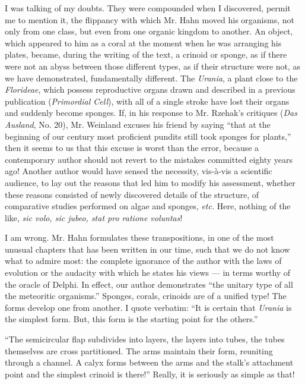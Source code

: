 \documentclass[a4paper, 12pt, oneside]{article}
\begin{document}
I was talking of my doubts. They were compounded when I discovered, permit me to mention it, the flippancy with which Mr. Hahn moved his organisms, not only from one class, but even from one organic kingdom to another. An object, which appeared to him as a coral at the moment when he was arranging his plates, became, during the writing of the text, a crinoid or sponge, as if there were not an abyss between those different types, as if their structure were not, as we have demonstrated, fundamentally different. The \emph{Urania}, a plant close to the \emph{Florideae}, which possess reproductive organs drawn and described in a previous publication (\emph{Primordial Cell}), with all of a single stroke have lost their organs and suddenly become sponges. If, in his response to Mr. Rzehak's critiques (\emph{Das Ausland}, No. 20), Mr. Weinland excuses his friend by saying ``that at the beginning of our century most proficient pundits still took sponges for plants,'' then it seems to us that this excuse is worst than the error, because a contemporary author should not revert to the mistakes committed eighty years ago! Another author would have sensed the necessity, vis-à-vis a scientific audience, to lay out the reasons that led him to modify his assessment, whether these reasons consisted of newly discovered details of the structure, of comparative studies performed on algae and sponges, \emph{etc.} Here, nothing of the like, \emph{sic volo, sic jubeo, stat pro ratione voluntas}!

I am wrong. Mr. Hahn formulates these transpositions, in one of the most unusual chapters that has been written in our time, such that we do not know what to admire most: the complete ignorance of the author with the laws of evolution or the audacity with which he states his views --- in terms worthy of the oracle of Delphi. In effect, our author demonstrates ``the unitary type of all the meteoritic organisms.'' Sponges, corals, crinoids are of a unified type! The forms develop one from another. I quote verbatim: ``It is certain that \emph{Urania} is the simplest form. But, this form is the starting point for the others.''

``The semicircular flap subdivides into layers, the layers into tubes, the tubes themselves are cross partitioned. The arms maintain their form, reuniting through a channel. A calyx forms between the arms and the stalk's attachment point and the simplest crinoid is there!'' Really, it is seriously as simple as that!
\end{document}
